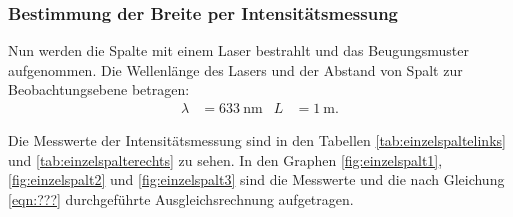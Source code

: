 \subsubsection{Bestimmung der Breite per Intensitätsmessung}

Nun werden die Spalte mit einem Laser bestrahlt und das Beugungsmuster aufgenommen.
Die Wellenlänge des Lasers und der Abstand von Spalt zur Beobachtungsebene betragen:
\begin{align*}
  \lambda &= \SI{633}{\nano\meter} & L &= \SI{1}{\meter}.
\end{align*}

Die Messwerte der Intensitätsmessung sind in den Tabellen \ref{tab:einzelspaltelinks} und \ref{tab:einzelspalterechts}
zu sehen. In den Graphen \ref{fig:einzelspalt1}, \ref{fig:einzelspalt2} und
\ref{fig:einzelspalt3} sind die Messwerte und die nach Gleichung \eqref{eqn:???}
durchgeführte Ausgleichsrechnung aufgetragen.

